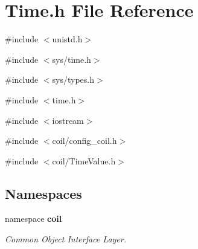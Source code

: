 \section{Time.h File Reference}
\label{Time_8h}
{\ttfamily \#include $<$unistd.h$>$}\par
{\ttfamily \#include $<$sys/time.h$>$}\par
{\ttfamily \#include $<$sys/types.h$>$}\par
{\ttfamily \#include $<$time.h$>$}\par
{\ttfamily \#include $<$iostream$>$}\par
{\ttfamily \#include $<$coil/config\_\-coil.h$>$}\par
{\ttfamily \#include $<$coil/TimeValue.h$>$}\par
\subsection*{Namespaces}
\begin{DoxyCompactItemize}
\item 
namespace {\bf coil}


\begin{DoxyCompactList}\small\item\em Common Object Interface Layer. \item\end{DoxyCompactList}

\end{DoxyCompactItemize}
